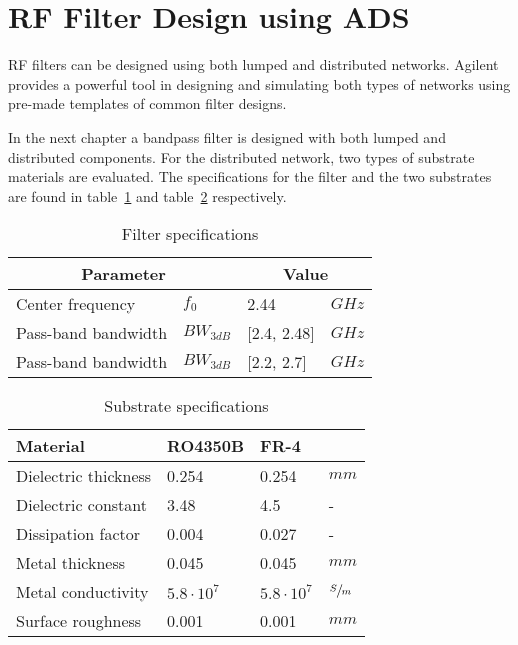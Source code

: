 \documentclass[report.tex]{subfiles}
\begin{document}
\pagebreak \section{RF Filter Design using ADS}
RF filters can be designed using both lumped and distributed networks. Agilent provides a powerful tool in designing and simulating both types of networks using pre-made templates of common filter designs.

In the next chapter a bandpass filter is designed with both lumped and distributed components. For the distributed network, two types of substrate materials are evaluated. The specifications for the filter and the two substrates are found in table~\ref{table:filter specs} and table~\ref{table:substrate specs} respectively.

\begin{table}[h]
    \centering
    \caption{Filter specifications}
    \begin{tabular}{l l l l}
        \multicolumn{2}{c}{Parameter} & \multicolumn{2}{c}{Value}\\
        \hline
        Center frequency & $f_0$ & 2.44 & $GHz$\\
        Pass-band bandwidth & $BW_{3 dB}$ & [2.4, 2.48] & $GHz$\\
        Pass-band bandwidth & $BW_{3 dB}$ & [2.2, 2.7]  & $GHz$\\
    \end{tabular}
    \label{table:filter specs}
\end{table}

\begin{table}[h]
    \centering
    \caption{Substrate specifications}
    \begin{tabular}{l l l l}
        Material & RO4350B & FR-4 & \\
        \hline
        Dielectric thickness & 0.254 & 0.254 & $mm$\\
        Dielectric constant  & 3.48  & 4.5   & -\\
        Dissipation factor   & 0.004 & 0.027 & -\\
        Metal thickness      & 0.045 & 0.045 & $mm$\\
        Metal conductivity   & $5.8 \cdot 10^{7}$ & $5.8 \cdot 10^{7}$ & $\sfrac{S}{m}$\\
        Surface roughness    & 0.001 & 0.001 & $mm$\\
    \end{tabular}
    \label{table:substrate specs}
\end{table}








\end{document}
